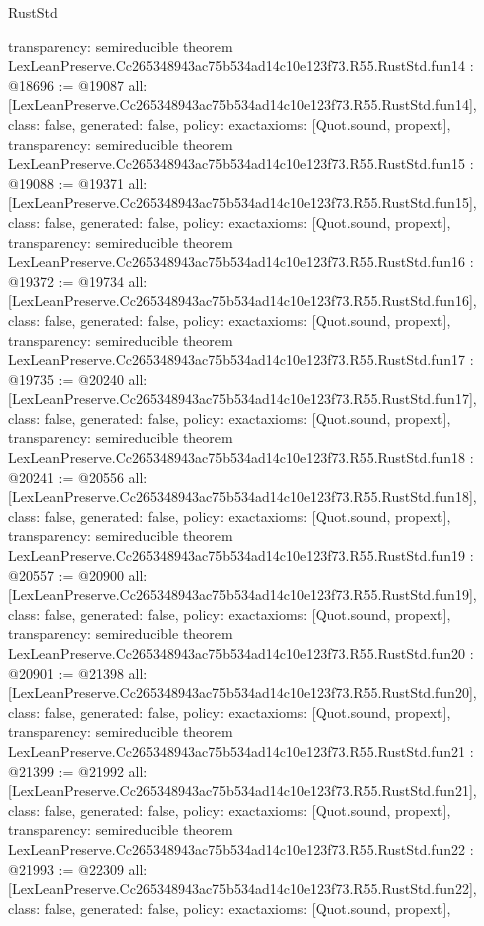 \begin{lexlean}{RustStd}
\begin{coremodule}
{  transparency: semireducible
}
theorem LexLeanPreserve.Cc265348943ac75b534ad14c10e123f73.R55.RustStd.fun14 : @18696 := @19087 {
  all: [LexLeanPreserve.Cc265348943ac75b534ad14c10e123f73.R55.RustStd.fun14],
  class: false,
  generated: false,
  policy: exact{axioms: [Quot.sound, propext]},
  transparency: semireducible
}
theorem LexLeanPreserve.Cc265348943ac75b534ad14c10e123f73.R55.RustStd.fun15 : @19088 := @19371 {
  all: [LexLeanPreserve.Cc265348943ac75b534ad14c10e123f73.R55.RustStd.fun15],
  class: false,
  generated: false,
  policy: exact{axioms: [Quot.sound, propext]},
  transparency: semireducible
}
theorem LexLeanPreserve.Cc265348943ac75b534ad14c10e123f73.R55.RustStd.fun16 : @19372 := @19734 {
  all: [LexLeanPreserve.Cc265348943ac75b534ad14c10e123f73.R55.RustStd.fun16],
  class: false,
  generated: false,
  policy: exact{axioms: [Quot.sound, propext]},
  transparency: semireducible
}
theorem LexLeanPreserve.Cc265348943ac75b534ad14c10e123f73.R55.RustStd.fun17 : @19735 := @20240 {
  all: [LexLeanPreserve.Cc265348943ac75b534ad14c10e123f73.R55.RustStd.fun17],
  class: false,
  generated: false,
  policy: exact{axioms: [Quot.sound, propext]},
  transparency: semireducible
}
theorem LexLeanPreserve.Cc265348943ac75b534ad14c10e123f73.R55.RustStd.fun18 : @20241 := @20556 {
  all: [LexLeanPreserve.Cc265348943ac75b534ad14c10e123f73.R55.RustStd.fun18],
  class: false,
  generated: false,
  policy: exact{axioms: [Quot.sound, propext]},
  transparency: semireducible
}
theorem LexLeanPreserve.Cc265348943ac75b534ad14c10e123f73.R55.RustStd.fun19 : @20557 := @20900 {
  all: [LexLeanPreserve.Cc265348943ac75b534ad14c10e123f73.R55.RustStd.fun19],
  class: false,
  generated: false,
  policy: exact{axioms: [Quot.sound, propext]},
  transparency: semireducible
}
theorem LexLeanPreserve.Cc265348943ac75b534ad14c10e123f73.R55.RustStd.fun20 : @20901 := @21398 {
  all: [LexLeanPreserve.Cc265348943ac75b534ad14c10e123f73.R55.RustStd.fun20],
  class: false,
  generated: false,
  policy: exact{axioms: [Quot.sound, propext]},
  transparency: semireducible
}
theorem LexLeanPreserve.Cc265348943ac75b534ad14c10e123f73.R55.RustStd.fun21 : @21399 := @21992 {
  all: [LexLeanPreserve.Cc265348943ac75b534ad14c10e123f73.R55.RustStd.fun21],
  class: false,
  generated: false,
  policy: exact{axioms: [Quot.sound, propext]},
  transparency: semireducible
}
theorem LexLeanPreserve.Cc265348943ac75b534ad14c10e123f73.R55.RustStd.fun22 : @21993 := @22309 {
  all: [LexLeanPreserve.Cc265348943ac75b534ad14c10e123f73.R55.RustStd.fun22],
  class: false,
  generated: false,
  policy: exact{axioms: [Quot.sound, propext]},
}
\end{coremodule}
\end{lexlean}
